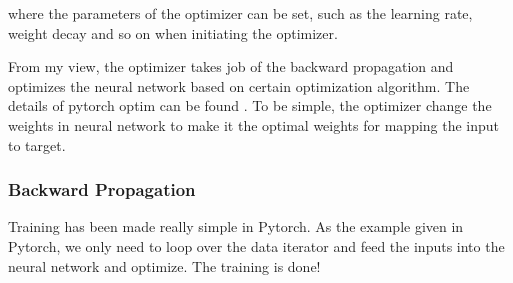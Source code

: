 \documentclass[letterpaper,10pt,english]{sphinxmanual}
\begin{document}
where the parameters of the optimizer can be set, such as the learning rate, weight decay and so on when initiating the optimizer.

From my view, the optimizer takes job of the backward propagation and optimizes the neural network based on certain optimization algorithm. The details of pytorch optim can be found  . To be simple, the optimizer change the weights in neural network to make it the optimal weights for mapping the input to target.


\subsubsection{Backward Propagation}
\label{\detokenize{usage/train:backward-propagation}}
Training has been made really simple in Pytorch. As the example given in Pytorch, we only need to loop over the data iterator and feed the inputs into the neural network and optimize. The training is done!
\end{document}
